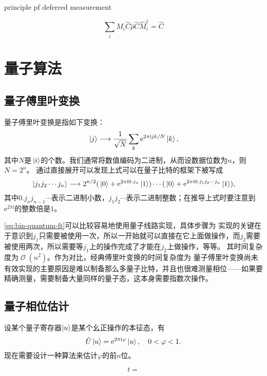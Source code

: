 \documentclass[hyperref, UTF8, a4paper]{ctexart}
\newcommand*{\ii}{\mathrm{i}}
\newcommand*{\ee}{\mathrm{e}}
\DeclareMathOperator{\bigO}{\mathcal{O}}
\begin{document}
principle pf deferred measurement

\[
    \sum_{i} \hat{M}_i \hat{C} \hat{\rho} \hat{C} \hat{M}_i^\dagger = \hat{C} 
\]

\section{量子算法}

\subsection{量子傅里叶变换}

量子傅里叶变换是指如下变换：
\begin{equation}
    \ket*{j} \longrightarrow \frac{1}{\sqrt{N}} \sum_k \ee^{2 \pi \ii j k / N} \ket*{k},
\end{equation}
其中$N$是$\ket*{i}$的个数。我们通常将数值编码为二进制，从而设数据位数为$n$，则$N=2^n$。
通过直接展开可以发现上式可以在量子比特的框架下被写成
\begin{equation}
    \ket*{j_1 j_2 \cdots j_n} \longrightarrow 2^{n/2} (\ket*{0} + \ee^{2\pi \ii 0.j_n} \ket*{1}) \cdots (\ket*{0} + \ee^{2 \pi \ii 0.j_1 j_2 \cdots j_n} \ket*{1}),
    \label{eq:bin-quantum-ft}
\end{equation}
其中$0.j_n j_{n-1} \cdots$表示二进制小数，$j_1 j_2 \cdots$表示二进制整数；在推导上式时要注意到$\ee^{2\pi \ii}$的整数倍是$1$。

\eqref{eq:bin-quantum-ft}可以比较容易地使用量子线路实现，具体步骤为
实现的关键在于意识到$j_1$只需要被使用一次，所以一开始就可以直接在它上面做操作，而$j_2$需要被使用两次，所以需要等$j_1$上的操作完成了才能在$j_2$上做操作，等等。
其时间复杂度为$\bigO(n^2)$。作为对比，经典傅里叶变换的时间复杂度为
量子傅里叶变换尚未有效实现的主要原因是难以制备那么多量子比特，并且也很难测量相位——如果要精确测量，需要制备大量同样的量子态，这本身需要指数次操作。

\subsection{量子相位估计}

设某个量子寄存器$\ket{u}$是某个幺正操作的本征态，有
\begin{equation}
    \hat{U} \ket{u} = \ee^{2\pi \ii \varphi} \ket{u}, \quad 0 < \varphi < 1.
\end{equation}
现在需要设计一种算法来估计$\varphi$的前$n$位。

\begin{equation}
    t = 
\end{equation}
\end{document}
